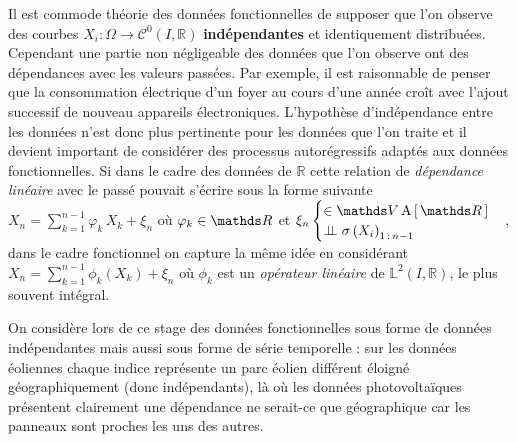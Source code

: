 Il est commode théorie des données fonctionnelles de supposer que l'on observe des courbes $X_i : \Omega \rightarrow \mathcal C^0(I, \mathds R)$ \textbf{indépendantes} et identiquement distribuées. Cependant une partie non négligeable des données que l'on observe ont des dépendances avec les valeurs passées. 
Par exemple, il est raisonnable de penser que la consommation électrique d'un foyer au cours d'une année croît avec l'ajout successif de nouveau appareils électroniques. 
L'hypothèse d'indépendance entre les données n'est donc plus pertinente pour les données que l'on traite et il devient important de considérer des processus autorégressifs adaptés aux données fonctionnelles.
Si dans le cadre des données de $\mathds R$ cette relation de \emph{dépendance linéaire} avec le passé pouvait s'écrire sous la forme suivante
$X_n = \sum\limits_{k=1}^{n-1} \varphi_k \, X_k + \xi_n$ où $\varphi_k \in \grandR$
et
$\xi_n \begin{cases} \in \mathds V \operatorname{A}\left[ \, \grandR \,\right] \\ \indep \sigma\left( X_i \right)_{1\,: \, n-1}\end{cases}$,
dans le cadre fonctionnel on capture la même idée en considérant
$X_n = \sum\limits_{k=1}^{n-1} \phi_k \left( X_k \right) + \xi_n$ où $\phi_k$
est un \emph{opérateur linéaire} de $\mathds L^2(I, \mathds R)$,
le plus souvent intégral.


On considère lors de ce stage des données fonctionnelles sous forme de données indépendantes mais aussi sous forme de série temporelle : sur les données éoliennes chaque indice représente un parc éolien différent éloigné géographiquement (donc indépendants), là où les données photovoltaïques présentent clairement une dépendance ne serait-ce que géographique car les panneaux sont proches les uns des autres.



